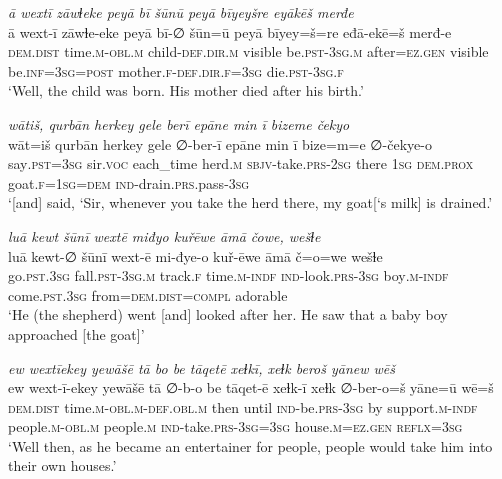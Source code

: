 \ea \label{KŠ.23}
\textit{ā wextī zāwɫeke peyā bī šūnū peyā bīyeyšre eyākēš merđe} \\ 
\gll ā wext-ī zāwɫe-eke peyā bī-∅ šūn=ū peyā bīyey=š=re eđā-ekē=š merđ-e \\ 
 \textsc{dem.dist} time\textsc{.m}\textsc{-obl}\textsc{.m} child\textsc{-def}\textsc{.dir}\textsc{.m} visible be\textsc{.pst}\textsc{-3sg}\textsc{.m} after\textsc{=ez.gen} visible be\textsc{.inf}\textsc{=3sg}\textsc{=\textsc{post}} mother\textsc{.f}\textsc{-def}\textsc{.dir}\textsc{.f}\textsc{=3sg} die\textsc{.pst}\textsc{-3sg}\textsc{.f} \\ 
\glt `Well, the child was born. His mother died after his birth.'
\z 
 
\ea \label{KŠ.28}
\textit{wātiš, qurbān herkey gele berī epāne min ī bizeme čekyo} \\ 
\gll wāt=iš qurbān herkey gele ∅-ber-ī epāne min ī bize=m=e ∅-čekye-o \\ 
 say\textsc{.pst}\textsc{=3sg} sir.\textsc{voc} each\_time herd\textsc{.m} \textsc{sbjv-}take\textsc{.prs}-\textsc{2sg} there \textsc{1sg} \textsc{dem.prox} goat\textsc{.f}\textsc{=\textsc{1sg}}\textsc{=dem} \textsc{ind-}drain\textsc{.prs}.pass\textsc{-3sg} \\ 
\glt `[and] said, ‘Sir, whenever you take the herd there, my goat[‘s milk] is drained.'
\z 
 
\ea \label{KŠ.30}
\textit{luā kewt šūnī wextē miđyo kuřēwe āmā čowe, wešɫe} \\ 
\gll luā kewt-∅ šūnī wext-ē mi-đye-o kuř-ēwe āmā č=o=we wešɫe \\ 
 go\textsc{.pst}\textsc{.3sg} fall\textsc{.pst}\textsc{-3sg}\textsc{.m} track\textsc{.f} time\textsc{.m}\textsc{-indf} \textsc{ind-}look\textsc{.prs}\textsc{-3sg} boy\textsc{.m}\textsc{-indf} come\textsc{.pst}\textsc{.3sg} from=\textsc{dem.dist}\textsc{=compl} adorable \\ 
\glt `He (the shepherd) went [and] looked after her. He saw that a baby boy approached [the goat]'
\z 
 
\ea \label{KŠ.38}
\textit{ew wextīekey yewāšē tā bo be tāqetē xeɫkī, xeɫk beroš yānew wēš} \\ 
\gll ew wext-ī-ekey yewāšē tā ∅-b-o be tāqet-ē xeɫk-ī xeɫk ∅-ber-o=š yāne=ū wē=š \\ 
 \textsc{dem.dist} time\textsc{.m}\textsc{-obl}\textsc{.m}\textsc{-def}\textsc{.obl}\textsc{.m} then until \textsc{ind-}be\textsc{.prs}\textsc{-3sg} by support\textsc{.m}\textsc{-indf} people\textsc{.m}\textsc{-obl}\textsc{.m} people\textsc{.m} \textsc{ind-}take\textsc{.prs}\textsc{-3sg}\textsc{=3sg} house\textsc{.m}\textsc{=ez.gen} \textsc{reflx}\textsc{=3sg} \\ 
\glt `Well then, as he became an entertainer for people, people would take him into their own houses.'
\z 
 
